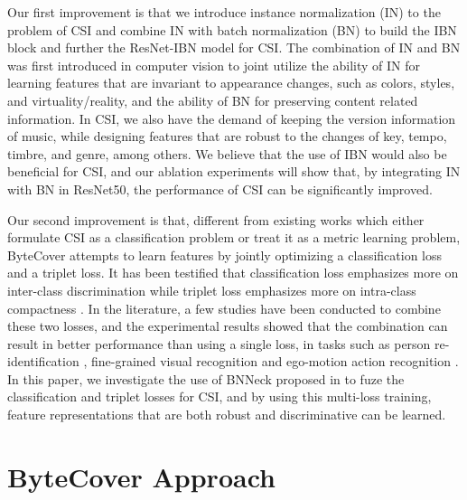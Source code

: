 \documentclass{article}
\begin{document}
Our first improvement is that we introduce instance normalization (IN) to the problem of CSI and combine IN with batch normalization (BN) to build the IBN block and further the ResNet-IBN model for CSI. The combination of IN and BN was first introduced in computer vision \cite{pan2018two} to joint utilize the ability of IN for learning features that are invariant to appearance changes, such as colors, styles, and virtuality/reality, and the ability of BN for preserving content related information. In CSI, we also have the demand of keeping the version information of music, while designing features that are robust to the changes of key, tempo, timbre, and genre, among others. We believe that the use of IBN would also be beneficial for CSI, and our ablation experiments will show that, by integrating IN with BN in ResNet50, the performance of CSI can be significantly improved.



Our second improvement is that, different from existing works which either formulate CSI as a classification problem or treat it as a metric learning problem, ByteCover attempts to learn features by jointly optimizing a classification loss and a triplet loss. It has been testified that classification loss emphasizes more on inter-class discrimination while triplet loss emphasizes more on intra-class compactness \cite{taha2020boosting}. In the literature, a few studies have been conducted to combine these two losses, and the experimental results showed that the combination can result in better performance than using a single loss, in tasks such as person re-identification \cite{luo2019bag}, fine-grained visual recognition and ego-motion
action recognition \cite{taha2020boosting}. In this paper, we investigate the use of BNNeck proposed in \cite{luo2019bag} to fuze the classification and triplet losses for CSI, and by using this multi-loss training, feature representations that are both robust and discriminative can be learned.











 


\section{ByteCover Approach}
\label{sec:approach}
\end{document}
